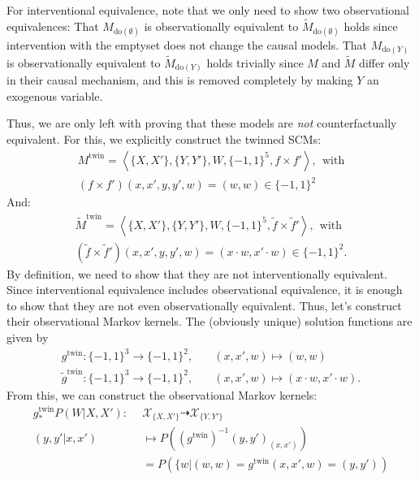 \begin{enumerate}
\begin{ungradedsolution}
\begin{enumerate}
			For interventional equivalence, note that we only need to show two observational equivalences:
			That $M_{\text{do}(\emptyset)}$ is observationally equivalent to $\tilde{M}_{\text{do}(\emptyset)}$ holds since intervention with the emptyset does not change the causal models.
			That $M_{\text{do}(Y)}$ is observationally equivalent to $\tilde{M}_{\text{do}(Y)}$ holds trivially since $M$ and $\tilde{M}$ differ only in their causal mechanism, and this is removed completely by making $Y$ an exogenous variable.

			Thus, we are only left with proving that these models are \emph{not} counterfactually equivalent.
			For this, we explicitly construct the twinned SCMs:
			\begin{align*}
				M^{\text{twin}} = \left\langle \{X, X'\}, \{Y, Y'\}, W, \{-1,1\}^5, f \times f' \right\rangle, \ \ \text{with} \\
				(f\times f')(x, x', y, y', w)  = (w, w) \in \{-1,1\}^2
			\end{align*}
			And:
			\begin{align*}
				\tilde{M}^{\text{twin}} = \left\langle \{X, X'\}, \{Y, Y'\}, W, \{-1,1\}^5, \tilde{f} \times \tilde{f}' \right\rangle, \ \ \text{with} \\
				(\tilde{f} \times \tilde{f}')(x, x', y, y', w) = (x \cdot w, x' \cdot w) \in \{-1, 1\}^2.
			\end{align*}
			By definition, we need to show that they are not interventionally equivalent.
			Since interventional equivalence includes observational equivalence, it is enough to show that they are not even observationally equivalent.
			Thus, let's construct their observational Markov kernels.
			The (obviously unique) solution functions are given by
			\begin{align*}
				g^{\text{twin}}: \{-1,1\}^3 \to \{-1,1\}^2,         & \quad (x, x', w) \mapsto (w, w)                   \\
				\tilde{g}^{\text{twin}}: \{-1,1\}^3 \to \{-1,1\}^2, & \quad (x, x', w) \mapsto (x \cdot w, x' \cdot w).
			\end{align*}
			From this, we can construct the observational Markov kernels:
			\begin{align*}
				g^{\text{twin}}_* P(W | X, X'): \ \  & \mathcal{X}_{\{X,X'\}} \dashrightarrow \mathcal{X}_{\{Y,Y'\}}            \\
				(y, y' | x, x')                      & \mapsto P\left((g^{\text{twin}})^{-1}(y, y')_{(x,x')}\right)             \\
				                                     & = P\left(\{w | (w,w) = g^{\text{twin}}(x, x', w) = (y, y')\right)        \\

\end{align*}
\end{enumerate}
\end{ungradedsolution}
\end{enumerate}
